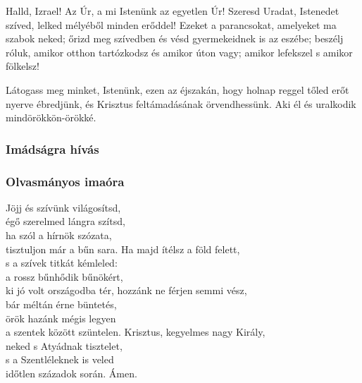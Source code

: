 \documentclass[twoside]{article}
\begin{document}
Halld, Izrael! Az Úr, a mi Istenünk az egyetlen Úr! Szeresd Uradat, Istenedet szíved, lelked mélyéből minden erőddel! Ezeket a parancsokat, amelyeket ma szabok neked; őrizd meg szívedben és vésd gyermekeidnek is az eszébe; beszélj róluk, amikor otthon tartózkodsz és amikor úton vagy; amikor lefekszel s amikor fölkelsz!


Látogass meg minket, Istenünk, ezen az éjszakán, hogy holnap reggel tőled erőt nyerve ébredjünk, és
Krisztus feltámadásának örvendhessünk. Aki él és uralkodik mindörökkön-örökké.


\subsubsection*{Imádságra hívás}
\begin{gregosheet}
\end{gregosheet}

\subsubsection*{Olvasmányos imaóra}

\begin{hymnstanzas}
    Jöjj és szívünk világosítsd,\\
    égő szerelmed lángra szítsd,\\
    ha szól a hírnök szózata,\\
    tisztuljon már a bűn sara.
\stanzabreak
    Ha majd ítélsz a föld felett,\\
    s a szívek titkát kémleled:\\
    a rossz bűnhődik bűnökért,\\
    ki jó volt országodba tér,
\stanzabreak
    hozzánk ne férjen semmi vész,\\
    bár méltán érne büntetés,\\
    örök hazánk mégis legyen\\
    a szentek között szüntelen.
\stanzabreak
    Krisztus, kegyelmes nagy Király,\\
    neked s Atyádnak tisztelet,\\
    s a Szentléleknek is veled\\
    időtlen századok során. Ámen.
\end{hymnstanzas}
\end{document}
